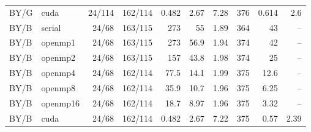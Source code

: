 \documentclass[11pt]{article}
\begin{document}
\begin{longtable}{llrrrrrrrr}
BY/G & cuda & 24/114 & 162/114 & 0.482 & 2.67 & 7.28 & 376 & 0.614 & 2.6\\
BY/B & serial & 24/68 & 163/115 & 273 & 55 & 1.89 & 364 & 43 & --\\
BY/B & openmp1 & 24/68 & 163/115 & 273 & 56.9 & 1.94 & 374 & 42 & --\\
BY/B & openmp2 & 24/68 & 163/115 & 157 & 43.8 & 1.98 & 374 & 25 & --\\
BY/B & openmp4 & 24/68 & 162/114 & 77.5 & 14.1 & 1.99 & 375 & 12.6 & --\\
BY/B & openmp8 & 24/68 & 162/114 & 35.9 & 10.7 & 1.96 & 375 & 6.25 & --\\
BY/B & openmp16 & 24/68 & 162/114 & 18.7 & 8.97 & 1.96 & 375 & 3.32 & --\\
BY/B & cuda & 24/68 & 162/114 & 0.482 & 2.67 & 7.22 & 375 & 0.57 & 2.39\\
\bottomrule\end{longtable}\normalsize
\end{document}
